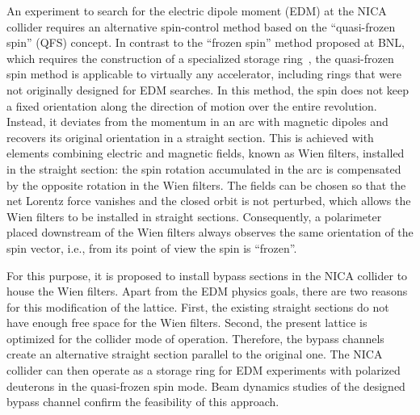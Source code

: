 \documentclass[%
  aps,
  pra,
  preprint,
  a4paper,
  amsmath,
  amssymb,
  floatfix,
  longbibliography,
  superscriptaddress
]{revtex4-2}
\begin{document}
An experiment to search for the electric dipole moment (EDM) at the NICA
collider requires an alternative spin-control method based on the
``quasi-frozen spin'' (QFS) concept. In contrast to the ``frozen spin''
method proposed at BNL, which requires the construction of a specialized storage
ring~\cite{srEDM:2008_deuteron_proposal}, the quasi-frozen spin method is applicable to
virtually any accelerator, including rings that were not originally designed
for EDM searches. In this method, the spin does not keep a fixed orientation
along the direction of motion over the entire revolution. Instead, it deviates
from the momentum in an arc with magnetic dipoles and recovers its original
orientation in a straight section. This is achieved with elements combining
electric and magnetic fields, known as Wien filters, installed in the straight
section: the spin rotation accumulated in the arc is compensated by the
opposite rotation in the Wien filters. The fields can be chosen so that the
net Lorentz force vanishes and the closed orbit is not perturbed, which allows
the Wien filters to be installed in straight sections. Consequently, a
polarimeter placed downstream of the Wien filters always observes the same
orientation of the spin vector, i.e., from its point of view the spin is
``frozen''.

For this purpose, it is proposed to install bypass sections in the NICA
collider to house the Wien filters. Apart from the EDM physics goals, there
are two reasons for this modification of the lattice. First, the existing
straight sections do not have enough free space for the Wien filters. Second,
the present lattice is optimized for the collider mode of operation.
Therefore, the bypass channels create an alternative straight section parallel
to the original one. The NICA collider can then operate as a storage ring for
EDM experiments with polarized deuterons in the quasi-frozen spin mode. Beam
dynamics studies of the designed bypass channel confirm the feasibility of
this approach.
\end{document}
